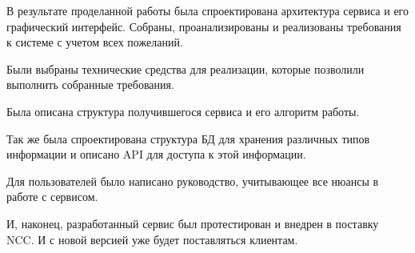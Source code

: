 \Conclusion %

В результате проделанной работы была спроектирована архитектура сервиса и его графический интерфейс.
Собраны, проанализированы и реализованы требования к системе с учетом всех пожеланий.

Были выбраны технические средства для реализации, которые позволили выполнить собранные требования.

Была описана структура получившегося сервиса и его алгоритм работы.

Так же была спроектирована структура БД для хранения различных типов информации и описано API
для доступа к этой информации.

Для пользователей было написано руководство, учитывающее все нюансы в работе с сервисом.

И, наконец, разработанный сервис был протестирован и внедрен в поставку NCC\@.
И с новой версией уже будет поставляться клиентам.
